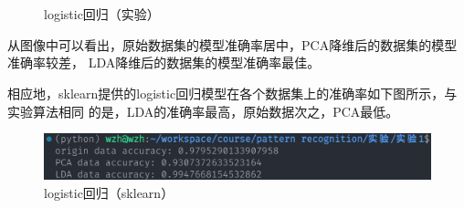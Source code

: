 \documentclass[notitlepage]{article}
\begin{document}
\begin{figure}[htbp]
	\centering
	\\
	\\
	\caption{logistic回归（实验）}
\end{figure}

从图像中可以看出，原始数据集的模型准确率居中，PCA降维后的数据集的模型准确率较差，
LDA降维后的数据集的模型准确率最佳。

相应地，sklearn提供的logistic回归模型在各个数据集上的准确率如下图所示，与实验算法相同
的是，LDA的准确率最高，原始数据次之，PCA最低。
\begin{figure}[htbp]
    \centering
    \includegraphics*[width=\columnwidth]{../imgs/sklearn/acc.png}
    \caption{logistic回归（sklearn）}
\end{figure}
\end{document}
